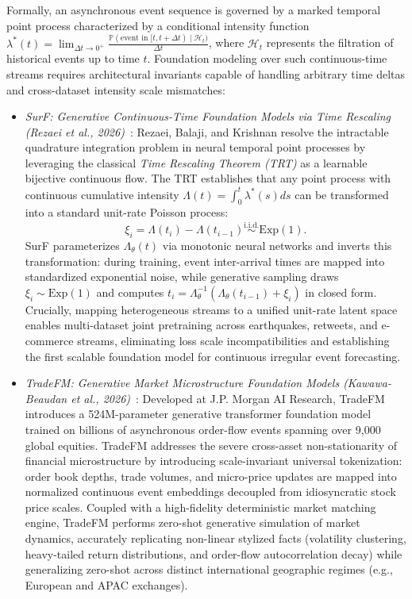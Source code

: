 Formally, an asynchronous event sequence is governed by a marked temporal point process characterized by a conditional intensity function $\lambda^*(t) = \lim_{\Delta t \to 0^+} \frac{\mathbb{P}(\text{event in } [t, t+\Delta t) \mid \mathcal{H}_t)}{\Delta t}$, where $\mathcal{H}_t$ represents the filtration of historical events up to time $t$. Foundation modeling over such continuous-time streams requires architectural invariants capable of handling arbitrary time deltas and cross-dataset intensity scale mismatches:
\begin{itemize}[leftmargin=*]
    \item \emph{SurF: Generative Continuous-Time Foundation Models via Time Rescaling (Rezaei et al., 2026)}~\cite{rezaei2026surf}: Rezaei, Balaji, and Krishnan resolve the intractable quadrature integration problem in neural temporal point processes by leveraging the classical \emph{Time Rescaling Theorem (TRT)} as a learnable bijective continuous flow. The TRT establishes that any point process with continuous cumulative intensity $\Lambda(t) = \int_0^t \lambda^*(s) ds$ can be transformed into a standard unit-rate Poisson process:
    \begin{equation}
        \xi_i = \Lambda(t_i) - \Lambda(t_{i-1}) \stackrel{\text{i.i.d.}}{\sim} \text{Exp}(1).
    \end{equation}
    SurF parameterizes $\Lambda_\theta(t)$ via monotonic neural networks and inverts this transformation: during training, event inter-arrival times are mapped into standardized exponential noise, while generative sampling draws $\xi_i \sim \text{Exp}(1)$ and computes $t_i = \Lambda_\theta^{-1}(\Lambda_\theta(t_{i-1}) + \xi_i)$ in closed form. Crucially, mapping heterogeneous streams to a unified unit-rate latent space enables multi-dataset joint pretraining across earthquakes, retweets, and e-commerce streams, eliminating loss scale incompatibilities and establishing the first scalable foundation model for continuous irregular event forecasting.
    \item \emph{TradeFM: Generative Market Microstructure Foundation Models (Kawawa-Beaudan et al., 2026)}~\cite{kawawabeaudan2026tradefm}: Developed at J.P. Morgan AI Research, TradeFM introduces a 524M-parameter generative transformer foundation model trained on billions of asynchronous order-flow events spanning over 9,000 global equities. TradeFM addresses the severe cross-asset non-stationarity of financial microstructure by introducing scale-invariant universal tokenization: order book depths, trade volumes, and micro-price updates are mapped into normalized continuous event embeddings decoupled from idiosyncratic stock price scales. Coupled with a high-fidelity deterministic market matching engine, TradeFM performs zero-shot generative simulation of market dynamics, accurately replicating non-linear stylized facts (volatility clustering, heavy-tailed return distributions, and order-flow autocorrelation decay) while generalizing zero-shot across distinct international geographic regimes (e.g., European and APAC exchanges).
\end{itemize}

